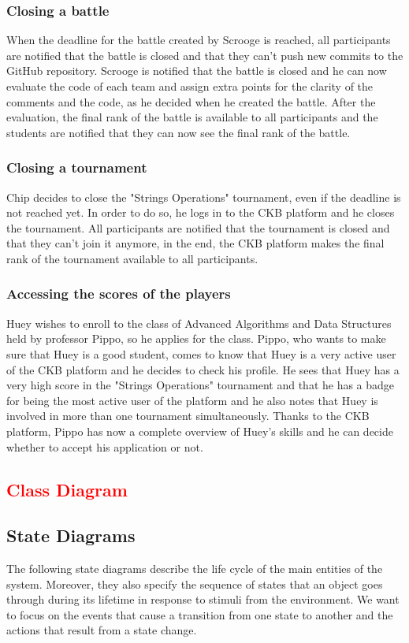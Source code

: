 \subsubsection{Closing a battle}
When the deadline for the battle created by Scrooge is reached, all participants are notified that the battle is closed and that they can't push new commits to the GitHub repository.
Scrooge is notified that the battle is closed and he can now evaluate the code of each team and assign extra points for the clarity of the comments and the code, as he decided when he created the battle.
After the evaluation, the final rank of the battle is available to all participants and the students are notified that they can now see the final rank of the battle.

\subsubsection{Closing a tournament}
Chip decides to close the "Strings Operations" tournament, even if the deadline is not reached yet.
In order to do so, he logs in to the CKB platform and he closes the tournament.
All participants are notified that the tournament is closed and that they can't join it anymore, in the end, the CKB platform makes the final rank of the tournament available to all participants.

\subsubsection{Accessing the scores of the players}
Huey wishes to enroll to the class of Advanced Algorithms and Data Structures held by professor Pippo, so he applies for the class.
Pippo, who wants to make sure that Huey is a good student, comes to know that Huey is a very active user of the CKB platform and he decides to check his profile.
He sees that Huey has a very high score in the "Strings Operations" tournament and that he has a badge for being the most active user of the platform and he also notes that Huey is involved in more than one tournament simultaneously.
Thanks to the CKB platform, Pippo has now a complete overview of Huey's skills and he can decide whether to accept his application or not.

\subsection{\textcolor{red}{Class Diagram}}

\subsection{State Diagrams}
The following state diagrams describe the life cycle of the main entities of the system.
Moreover, they also specify the sequence of states that an object goes through during its lifetime in response to stimuli from the environment.
We want to focus on the events that cause a transition from one state to another and the actions that result from a state change.


